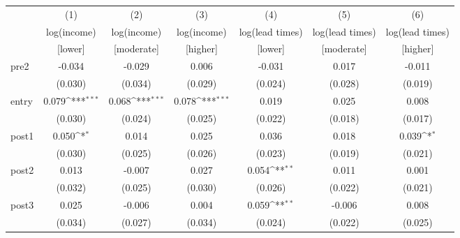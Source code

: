 {
\def\sym#1{\ifmmode^{#1}\else\(^{#1}\)\fi}
\begin{adjustbox}{max width=\textwidth}
\begin{tabular}{l*{6}{c}}
\toprule
            &\multicolumn{1}{c}{(1)}&\multicolumn{1}{c}{(2)}&\multicolumn{1}{c}{(3)}&\multicolumn{1}{c}{(4)}&\multicolumn{1}{c}{(5)}&\multicolumn{1}{c}{(6)}\\
            &\multicolumn{1}{c}{log(income)}&\multicolumn{1}{c}{log(income)}&\multicolumn{1}{c}{log(income)}&\multicolumn{1}{c}{log(lead times)}&\multicolumn{1}{c}{log(lead times)}&\multicolumn{1}{c}{log(lead times)}\\
            &[lower]&[moderate]&[higher]&[lower]&[moderate]&[higher]\\
\midrule
pre2        &      -0.034         &      -0.029         &       0.006         &      -0.031         &       0.017         &      -0.011         \\
            &     (0.030)         &     (0.034)         &     (0.029)         &     (0.024)         &     (0.028)         &     (0.019)         \\
\addlinespace
entry       &       0.079\sym{***}&       0.068\sym{***}&       0.078\sym{***}&       0.019         &       0.025         &       0.008         \\
            &     (0.030)         &     (0.024)         &     (0.025)         &     (0.022)         &     (0.018)         &     (0.017)         \\
\addlinespace
post1       &       0.050\sym{*}  &       0.014         &       0.025         &       0.036         &       0.018         &       0.039\sym{*}  \\
            &     (0.030)         &     (0.025)         &     (0.026)         &     (0.023)         &     (0.019)         &     (0.021)         \\
\addlinespace
post2       &       0.013         &      -0.007         &       0.027         &       0.054\sym{**} &       0.011         &       0.001         \\
            &     (0.032)         &     (0.025)         &     (0.030)         &     (0.026)         &     (0.022)         &     (0.021)         \\
\addlinespace
post3       &       0.025         &      -0.006         &       0.004         &       0.059\sym{**} &      -0.006         &       0.008         \\
            &     (0.034)         &     (0.027)         &     (0.034)         &     (0.024)         &     (0.022)         &     (0.025)         \\

\end{tabular}
\end{adjustbox}}
